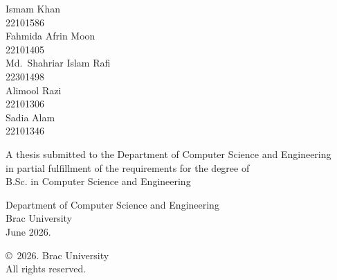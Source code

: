 \begin{titlepage}
\renewcommand*{\thepage}{Title}

    \begin{center}
        \vspace*{3cm}

        {\fontsize{16pt}{22pt}\selectfont{LecSeg-30: A Reproducible Low-Resource Benchmark and Diagnostic Study for Lecture-Video Topic Segmentation}
        }

        \vspace{1.5cm}


        \vspace{0.5cm}

        	Ismam Khan\\
	        22101586\\
	        Fahmida Afrin Moon\\
	        22101405\\
	        Md.\ Shahriar Islam Rafi\\
	        22301498\\
	        Alimool Razi\\
	        22101306\\
	        Sadia Alam\\
	        22101346

        \vspace{1.5cm}

        	A thesis submitted to the Department of Computer Science and Engineering\\
            in partial fulfillment of the requirements for the degree of\\
            B.Sc. in Computer Science and Engineering

        \vspace{2.5cm}

    		Department of Computer Science and Engineering\\
            Brac University\\
            June 2026.

        \vspace{3cm}

    		\copyright\ 2026. Brac University\\
            All rights reserved.

    \end{center}

\end{titlepage}
